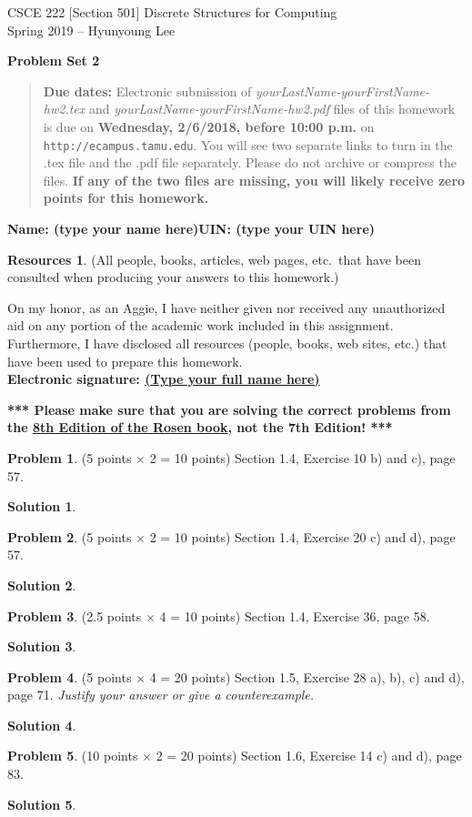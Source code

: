 \documentclass{article}
\theoremstyle{definition}
\newtheorem{problem}{Problem}
\newtheorem*{solution}{Solution}
\newtheorem*{resources}{Resources}
\newcommand{\name}[2]{\noindent\textbf{Name: #1}\hfill \textbf{UIN: #2}}
\newcommand{\honor}{\noindent On my honor, as an Aggie, I have neither
  given nor received any unauthorized aid on any portion of the
  academic work included in this assignment. Furthermore, I have
  disclosed all resources (people, books, web sites, etc.) that have
  been used to prepare this homework. \\[2ex]
 \textbf{Electronic signature: \underline{ (Type your full name here) } }}
\newcommand{\problemset}[1]{\begin{center}\textbf{Problem Set #1}\end{center}}
\newcommand{\duedate}[1]{\begin{quote}\textbf{Due dates:} Electronic
    submission of \textsl{yourLastName-yourFirstName-hw2.tex} and 
    \textsl{yourLastName-yourFirstName-hw2.pdf} files of this homework is due on
    \textbf{#1} on \texttt{http://ecampus.tamu.edu}. You will see two separate links
    to turn in the .tex file and the .pdf file separately. Please do not archive or compress the files.
    \textbf{If any of the two files are missing, you will likely receive zero points for this 
    homework.}\end{quote} }
\begin{document}
\vspace*{-15mm}
\begin{center}
{\large
CSCE 222 [Section 501] Discrete Structures for Computing\\[.5ex]
Spring 2019 -- Hyunyoung Lee\\}
\end{center}
\problemset{2}
\duedate{Wednesday, 2/6/2018, before 10:00 p.m.}
\name{(type your name here)}{(type your UIN here)}
\begin{resources} (All people, books, articles, web pages, etc.\ that
  have been consulted when producing your answers to this homework.)
\end{resources}
\honor

\bigskip

\noindent
\textbf{*** Please make sure that you are solving the correct problems from 
the \underline{8th Edition of the Rosen book}, not the 7th Edition! ***}

\medskip

\begin{problem} (5 points $\times$ 2 = 10 points) Section 1.4, Exercise 10 b) and c), page 57. 
\end{problem}
\begin{solution}
\end{solution}

\begin{problem} (5 points $\times$ 2 = 10 points) Section 1.4, Exercise 20 c) and d), page 57.
\end{problem}
\begin{solution}
\end{solution}

\begin{problem} (2.5 points $\times$ 4 = 10 points) Section 1.4, Exercise 36, page 58.
\end{problem}
\begin{solution}
\end{solution}

\begin{problem} (5 points $\times$ 4 = 20 points) Section 1.5, Exercise 28 a), b), c) and d), page 71. 
\textsl{Justify your answer or give a counterexample.}
\end{problem}
\begin{solution}
\end{solution}

\begin{problem} (10 points $\times$ 2 = 20 points) Section 1.6, Exercise 14 c) and d), page 83.
\end{problem}
\begin{solution}
\end{solution}
\end{document}
